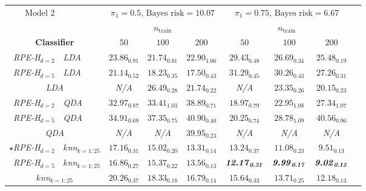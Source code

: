 \documentclass{amsart}
\providecommand{\tabularnewline}{\\}
\begin{document}
\begin{table}[p]
	\small
	\begin{centering}
		\begin{tabular}{r|l|c|c|c|c|c|c|c}
			\multicolumn{1}{r}{$\boxed{\text{Model 2}}$} & \multicolumn{1}{l}{} & \multicolumn{3}{c}{$\pi_{1}=0.5$, $\text{Bayes risk}=10.07$} & \multicolumn{3}{c}{$\pi_{1}=0.75$, $\text{Bayes risk}=6.67$} & \tabularnewline
			\multicolumn{1}{r}{} &  & \multicolumn{3}{c|}{$n_{\mathrm{train}}$} & \multicolumn{3}{c|}{$n_{\mathrm{train}}$} & \tabularnewline
			\multicolumn{2}{c|}{\textbf{Classifier}} & $50$ & $100$ & $200$ & $50$ & $100$ & $200$ & \tabularnewline
			\hline 
			\emph{RPE-H$_{d=2}$} & \emph{LDA} & $\mathit{23.86_{0.91}}$ & $\mathit{21.74_{0.81}}$ & $\mathit{22.90_{1.06}}$ & $\mathit{29.43_{0.48}}$ & $\mathit{26.69_{0.34}}$ & $\mathit{25.48_{0.19}}$ & \tabularnewline
			\hline 
			\emph{RPE-H$_{d=5}$} & \emph{LDA} & $\mathit{21.14_{0.52}}$ & $\mathit{18.23_{0.35}}$ & $\mathit{17.50_{0.43}}$ & $\mathit{31.29_{0.45}}$ & $\mathit{30.26_{0.43}}$ & $\mathit{27.26_{0.31}}$ & \tabularnewline
			\hline 
			\multicolumn{2}{c|}{\emph{LDA}} & \emph{N/A} & $\mathit{26.49_{0.28}}$ & $\mathit{21.74_{0.22}}$ & \emph{N/A} & $\mathit{23.35_{0.26}}$ & $\mathit{20.15_{0.23}}$ & \tabularnewline
			\hline 
			\emph{RPE-H$_{d=2}$} & \emph{QDA} & $\mathit{32.97_{0.87}}$ & $\mathit{33.41_{1.03}}$ & $\mathit{38.89_{0.71}}$ & $\mathit{18.97_{0.79}}$ & $\mathit{22.95_{1.08}}$ & $\mathit{27.34_{1.07}}$ & \tabularnewline
			\hline 
			\emph{RPE-H$_{d=5}$} & \emph{QDA} & $\mathit{34.91_{0.69}}$ & $\mathit{37.35_{0.75}}$ & $\mathit{40.90_{0.40}}$ & $\mathit{20.25_{0.74}}$ & $\mathit{28.78_{1.09}}$ & $\mathit{40.56_{0.96}}$ & \tabularnewline
			\hline 
			\multicolumn{2}{c|}{\emph{QDA}} & \emph{N/A} & \emph{N/A} & $\mathit{39.95_{0.23}}$ & \emph{N/A} & \emph{N/A} & \emph{N/A} & \tabularnewline
			\hline 
			\emph{$\star$RPE-H$_{d=2}$} & \emph{$k$nn$_{k=1:25}$} & $\mathit{17.16_{0.31}}$ & $\mathit{15.02_{0.20}}$ & $\mathit{13.31_{0.14}}$ & $\mathit{13.24_{0.37}}$ & $\mathit{11.08_{0.23}}$ & $\mathit{9.51_{0.13}}$ & \tabularnewline
			\hline 
			\emph{RPE-H$_{d=5}$} & \emph{$k$nn$_{k=1:25}$} & $\mathit{16.86_{0.27}}$ & $\mathit{15.37_{0.22}}$ & $\mathit{13.56_{0.13}}$ & $\mbox{\textbf{\emph{12.17}}}_{\text{\textbf{\emph{0.31}}}}$ & $\mbox{\textbf{\emph{9.99}}}_{\text{\textbf{\emph{0.17}}}}$ & $\mbox{\textbf{\emph{9.02}}}_{\text{\textbf{\emph{0.12}}}}$ & \tabularnewline
			\hline 
			\multicolumn{2}{c|}{\emph{$k$nn$_{k=1:25}$}} & $\mathit{20.26_{0.37}}$ & $\mathit{18.33_{0.18}}$ & $\mathit{16.79_{0.14}}$ & $\mathit{15.64_{0.33}}$ & $\mathit{13.71_{0.25}}$ & $\mathit{12.18_{0.13}}$ & \tabularnewline
			\hline 
			\hline 

\end{tabular}
\end{centering}
\end{table}
\end{document}
